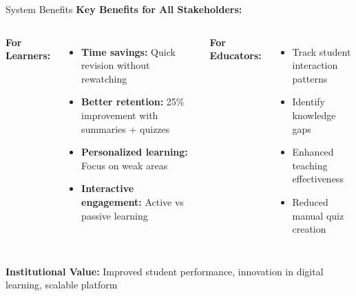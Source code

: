 \documentclass{beamer}
\begin{document}
\begin{frame}{System Benefits}
    \textbf{Key Benefits for All Stakeholders:}
    
    \begin{columns}
        \textbf{For Learners:}
        \begin{itemize}
            \item \textbf{Time savings:} Quick revision without rewatching
            \item \textbf{Better retention:} 25\% improvement with summaries + quizzes
            \item \textbf{Personalized learning:} Focus on weak areas
            \item \textbf{Interactive engagement:} Active vs passive learning
        \end{itemize}
        
        \textbf{For Educators:}
        \begin{itemize}
            \item Track student interaction patterns
            \item Identify knowledge gaps
            \item Enhanced teaching effectiveness
            \item Reduced manual quiz creation
        \end{itemize}
    \end{columns}
    
    \vspace{0.3cm}
    \textbf{Institutional Value:} Improved student performance, innovation in digital learning, scalable platform
\end{frame}
\end{document}
